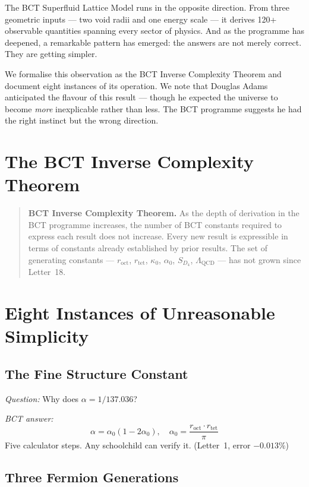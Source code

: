 \documentclass[aps,prl,twocolumn,superscriptaddress,floatfix]{revtex4-2}
\begin{document}
The BCT Superfluid Lattice Model runs in the opposite direction.
From three geometric inputs --- two void radii and one energy
scale --- it derives 120+ observable quantities spanning every
sector of physics. And as the programme has deepened, a
remarkable pattern has emerged: the answers are not merely
correct. They are getting simpler.

We formalise this observation as the BCT Inverse Complexity Theorem
and document eight instances of its operation. We note that Douglas
Adams anticipated the flavour of this result --- though he expected
the universe to become \textit{more} inexplicable rather than less.
The BCT programme suggests he had the right instinct but the
wrong direction.

\section{The BCT Inverse Complexity Theorem}

\begin{quotation}
\textbf{BCT Inverse Complexity Theorem.}
As the depth of derivation in the BCT programme increases, the
number of BCT constants required to express each result does not
increase. Every new result is expressible in terms of constants
already established by prior results. The set of generating
constants --- $r_\mathrm{oct}$, $r_\mathrm{tet}$, $\kappa_0$,
$\alpha_0$, $S_{D_4}$, $\Lambda_\mathrm{QCD}$ --- has not grown
since Letter~18.
\end{quotation}

\section{Eight Instances of Unreasonable Simplicity}

\subsection{The Fine Structure Constant}

\noindent\textit{Question:} Why does $\alpha = 1/137.036$?

\noindent\textit{BCT answer:}
\begin{equation}
  \alpha = \alpha_0(1 - 2\alpha_0), \quad \alpha_0
  = \frac{r_\mathrm{oct} \cdot r_\mathrm{tet}}{\pi}
\end{equation}
Five calculator steps. Any schoolchild can verify it.
(Letter~1, error $-0.013\%$)

\subsection{Three Fermion Generations}
\end{document}
